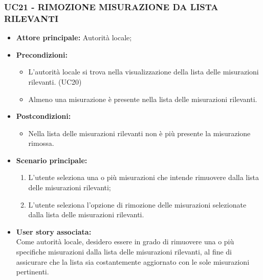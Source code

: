 \subsubsection{UC21 - RIMOZIONE MISURAZIONE DA LISTA RILEVANTI}
\begin{itemize}
      \item \textbf{Attore principale:} Autorità locale;
      \item \textbf{Precondizioni:}
            \begin{itemize}
                  \item L'autorità locale si trova nella visualizzazione della lista delle misurazioni rilevanti. (UC20)
                  \item Almeno una misurazione è presente nella lista delle misurazioni rilevanti.
            \end{itemize}
      \item \textbf{Postcondizioni:}
            \begin{itemize}
                  \item Nella lista delle misurazioni rilevanti non è più presente la misurazione rimossa.
            \end{itemize}
      \item \textbf{Scenario principale:}
            \begin{enumerate}
                  \item L'utente seleziona una o più misurazioni che intende rimuovere dalla lista delle misurazioni rilevanti;
                  \item L'utente seleziona l'opzione di rimozione delle misurazioni selezionate dalla lista delle misurazioni rilevanti.
            \end{enumerate}
      \item \textbf{User story associata:} \\
            Come autorità locale, desidero essere in grado di rimuovere una o più specifiche misurazioni dalla lista delle misurazioni rilevanti, al fine di assicurare che la lista sia costantemente aggiornato con le sole misurazioni pertinenti.
\end{itemize}